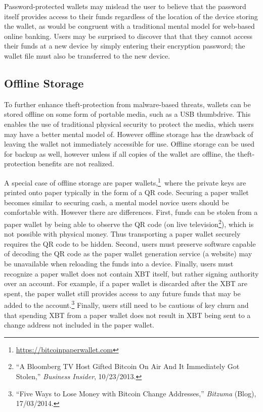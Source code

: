 
Password-protected wallets may mislead the user to believe that the password itself provides access to their funds regardless of the location of the device storing the wallet, as would be congruent with a traditional mental model for web-based online banking. Users may be surprised to discover that that they cannot access their funds at a new device by simply entering their encryption password; the wallet file must also be transferred to the new device. 

\subsection{Offline Storage}
\label{sec:offline storage}

To further enhance theft-protection from malware-based threats, wallets can be stored offline on some form of portable media, such as a USB thumbdrive. This enables the use of traditional physical security to protect the media, which users may have a better mental model of. However offline storage has the drawback of leaving the wallet not immediately accessible for use. Offline storage can be used for backup as well, however unless if all copies of the wallet are offline, the theft-protection benefits are not realized. 

A special case of offline storage are paper wallets,\footnote{\url {https://bitcoinpaperwallet.com}}\ where the private keys are printed onto paper typically in the form of a QR code. Securing a paper wallet becomes similar to securing cash, a mental model novice users should be comfortable with. However there are differences. First, funds can be stolen from a paper wallet by being able to observe the QR code (\eg on live television\footnote{``A Bloomberg TV Host Gifted Bitcoin On Air And It Immediately Got Stolen,'' \textit{Business Insider}, 10/23/2013.}), which is not possible with physical money. Thus transporting a paper wallet securely requires the QR code to be hidden. Second, users must preserve software capable of decoding the QR code as the paper wallet generation service (\eg a website) may be unavailable when reloading the funds into a device. Finally, users must recognize a paper wallet does not contain XBT itself, but rather signing authority over an account. For example, if a paper wallet is discarded after the XBT are spent, the paper wallet still provides access to any future funds that may be added to the account.\footnote{``Five Ways to Lose Money with Bitcoin Change Addresses,'' \textit{Bitzuma} (Blog), 17/03/2014.} Finally, users still need to be cautious of key churn and that spending XBT from a paper wallet does not result in XBT being sent to a change address not included in the paper wallet. 

